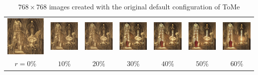 \begin{table}[!htb]
\begin{tabular}{c c@{}c@{}c@{}c@{}c@{}c}
    \includegraphics[width=0.135\linewidth]{chapter/appendix/def_imgs/church/ch_0.png} &
    \includegraphics[width=0.135\linewidth]{chapter/appendix/def_imgs/church/ch_10.png} &
    \includegraphics[width=0.135\linewidth]{chapter/appendix/def_imgs/church/ch_20.png} &
    \includegraphics[width=0.135\linewidth]{chapter/appendix/def_imgs/church/ch_30.png} &
    \includegraphics[width=0.135\linewidth]{chapter/appendix/def_imgs/church/ch_40.png} &
    \includegraphics[width=0.135\linewidth]{chapter/appendix/def_imgs/church/ch_50.png} &
    \includegraphics[width=0.135\linewidth]{chapter/appendix/def_imgs/church/ch_60.png} \\
    \(r=0\%\) & \(10\%\) & \(20\%\) & \(30\%\) & \(40\%\) & \(50\%\) & \(60\%\) \\
\end{tabular}
\caption{$768 \times 768$ images created with the original default configuration of ToMe}
\end{table}

